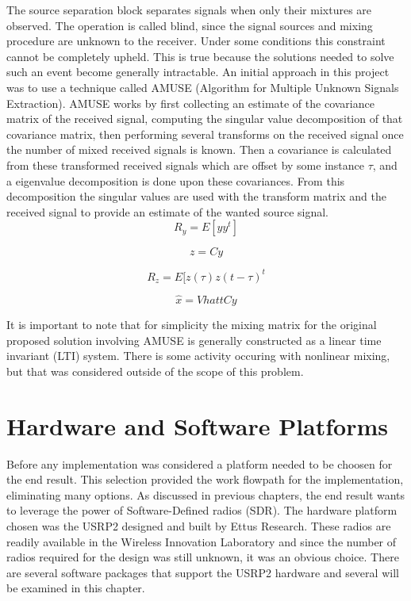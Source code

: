 The source separation block separates signals when only their mixtures are observed.  The operation is called blind, since the signal sources and mixing procedure are unknown to the receiver.  Under some conditions this constraint cannot be completely upheld.  This is true because the solutions needed to solve such an event become generally intractable.  An initial approach in this project was to use a technique called AMUSE (Algorithm for Multiple Unknown Signals Extraction)\cite{AMUSE}.  AMUSE works by first collecting an estimate of the covariance matrix of the received signal, computing the singular value decomposition of that covariance matrix, then performing several transforms on the received signal once the number of mixed received signals is known.  Then a covariance is calculated from these transformed received signals which are offset by some instance \(\tau\), and a eigenvalue decomposition is done upon these covariances.  From this decomposition the singular values are used with the transform matrix and the received signal to provide an estimate of the wanted source signal.\\

\begin{equation}\label{}
R_{y}=E[yy^{t}]
\end{equation}

\begin{equation}\label{}
z=Cy
\end{equation}

\begin{equation}\label{}
R_{z}=E[z(\tau)z(t-\tau)^{t}
\end{equation}

\begin{equation}\label{}
\hat{x}=Vhat{t}Cy
\end{equation}

It is important to note that for simplicity the mixing matrix for the original proposed solution involving AMUSE is generally constructed as a linear time invariant (LTI) system.  There is some activity occuring with nonlinear mixing, but that was considered outside of the scope of this problem.\\

\section{Hardware and Software Platforms}

Before any implementation was considered a platform needed to be choosen for the end result.  This selection provided the work flowpath for the implementation, eliminating many options.  As discussed in previous chapters, the end result wants to leverage the power of Software-Defined radios (SDR).  The hardware platform chosen was the USRP2 designed and built by Ettus Research\cite{USRP2Stats}.  These radios are readily available in the Wireless Innovation Laboratory and since the number of radios required for the design was still unknown, it was an obvious choice.  There are several software packages that support the USRP2 hardware and several will be examined in this chapter.\\


